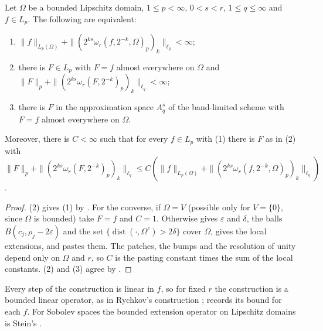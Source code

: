 \begin{theorem}
\label{thm:bounded-lipschitz-besov}
\leanok
{}
Let $\Omega$ be a bounded Lipschitz domain, $1 \leq p < \infty$, $0 < s < r$,
$1 \leq q \leq \infty$ and $f \in L_p$. The following are equivalent:
\begin{enumerate}
  \item $\|f\|_{L_p(\Omega)} + \|(2^{ks} \omega_r(f, 2^{-k}, \Omega)_p)_k\|_{\ell_q} < \infty$;
  \item there is $F \in L_p$ with $F = f$ almost everywhere on $\Omega$ and
    $\|F\|_p + \|(2^{ks} \omega_r(F, 2^{-k})_p)_k\|_{\ell_q} < \infty$;
  \item there is $F$ in the approximation space $A^s_q$ of the band-limited scheme with $F = f$
    almost everywhere on $\Omega$.
\end{enumerate}
Moreover, there is $C < \infty$ such that for every $f \in L_p$ with (1) there is $F$ as in (2)
with $\|F\|_p + \|(2^{ks} \omega_r(F, 2^{-k})_p)_k\|_{\ell_q} \leq
C (\|f\|_{L_p(\Omega)} + \|(2^{ks} \omega_r(f, 2^{-k}, \Omega)_p)_k\|_{\ell_q})$.
\end{theorem}

\begin{proof}
\leanok
(2) gives (1) by . For the converse, if $\Omega = V$ (possible
only for $V = \{0\}$, since $\Omega$ is bounded) take $F = f$ and $C = 1$. Otherwise
 gives $\varepsilon$ and $\delta$, the balls
$B(c_j, \rho_j - 2\varepsilon)$ and the set $\{\operatorname{dist}(\cdot, \Omega^c) > 2\delta\}$
cover $\overline\Omega$,  gives the local extensions, and
 pastes them. The patches, the bumps and the resolution of unity depend only on
$\Omega$ and $r$, so $C$ is the pasting constant times the sum of the local constants. (2) and
(3) agree by .
\end{proof}

Every step of the construction is linear in $f$, so for fixed $r$ the construction is a bounded
linear operator, as in Rychkov's construction \cite{Rychkov}; 
records its bound for each $f$. For Sobolev spaces the bounded
extension operator on Lipschitz domains is Stein's
\cite[Chapter VI, \S 3, Theorem 5]{SteinSingular}.

